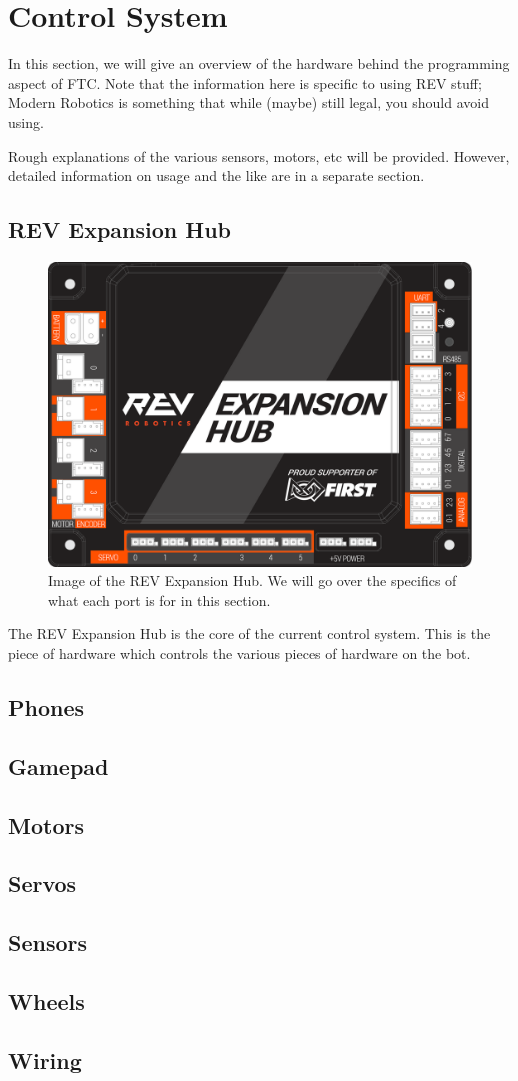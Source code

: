 \documentclass[../main.tex]{subfiles}
\begin{document}
\newpage
\section{Control System}
In this section, we will give an overview of the hardware behind the programming aspect of FTC. Note that the information here is specific to using REV stuff; Modern Robotics is something that while (maybe) still legal, you should avoid using.

Rough explanations of the various sensors, motors, etc will be provided. However, detailed information on usage and the like are in a separate section.
\subsection{REV Expansion Hub}
\begin{figure}[H]
    \includegraphics{1/images/expansion_hub_four.png}
    \caption{Image of the REV Expansion Hub. We will go over the specifics of what each port is for in this section.}
\end{figure}
The REV Expansion Hub is the core of the current control system. This is the piece of hardware which controls the various pieces of hardware on the bot. 
\subsection{Phones}
\subsection{Gamepad}
\subsection{Motors}
\subsection{Servos}
\subsection{Sensors}
\subsection{Wheels}
\subsection{Wiring}
\end{document}
